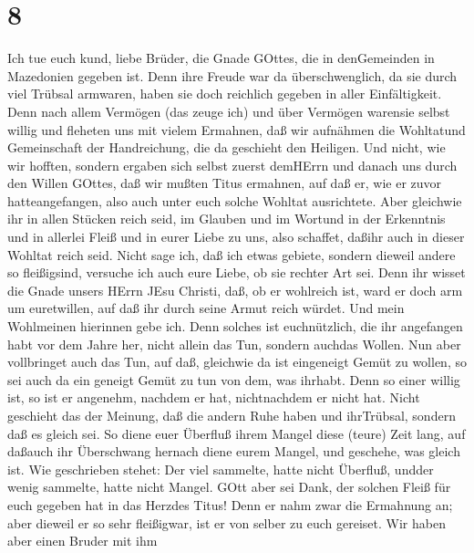 \hypertarget{section-7}{%
\section{8}\label{section-7}}

 Ich tue euch kund, liebe Brüder, die Gnade GOttes, die in
denGemeinden in Mazedonien gegeben ist.  Denn ihre Freude
war da überschwenglich, da sie durch viel Trübsal armwaren, haben sie
doch reichlich gegeben in aller Einfältigkeit.  Denn nach
allem Vermögen (das zeuge ich) und über Vermögen warensie selbst willig
 und fleheten uns mit vielem Ermahnen, daß wir aufnähmen die
Wohltatund Gemeinschaft der Handreichung, die da geschieht den Heiligen.
 Und nicht, wie wir hofften, sondern ergaben sich selbst
zuerst demHErrn und danach uns durch den Willen GOttes,  daß
wir mußten Titus ermahnen, auf daß er, wie er zuvor hatteangefangen,
also auch unter euch solche Wohltat ausrichtete.  Aber
gleichwie ihr in allen Stücken reich seid, im Glauben und im Wortund in
der Erkenntnis und in allerlei Fleiß und in eurer Liebe zu uns, also
schaffet, daßihr auch in dieser Wohltat reich seid.  Nicht
sage ich, daß ich etwas gebiete, sondern dieweil andere so fleißigsind,
versuche ich auch eure Liebe, ob sie rechter Art sei.  Denn
ihr wisset die Gnade unsers HErrn JEsu Christi, daß, ob er wohlreich
ist, ward er doch arm um euretwillen, auf daß ihr durch seine Armut
reich würdet.  Und mein Wohlmeinen hierinnen gebe ich. Denn
solches ist euchnützlich, die ihr angefangen habt vor dem Jahre her,
nicht allein das Tun, sondern auchdas Wollen.  Nun aber
vollbringet auch das Tun, auf daß, gleichwie da ist eingeneigt Gemüt zu
wollen, so sei auch da ein geneigt Gemüt zu tun von dem, was ihrhabt.
 Denn so einer willig ist, so ist er angenehm, nachdem er
hat, nichtnachdem er nicht hat.  Nicht geschieht das der
Meinung, daß die andern Ruhe haben und ihrTrübsal, sondern daß es gleich
sei.  So diene euer Überfluß ihrem Mangel diese (teure)
Zeit lang, auf daßauch ihr Überschwang hernach diene eurem Mangel, und
geschehe, was gleich ist.  Wie geschrieben stehet: Der viel
sammelte, hatte nicht Überfluß, undder wenig sammelte, hatte nicht
Mangel.  GOtt aber sei Dank, der solchen Fleiß für euch
gegeben hat in das Herzdes Titus!  Denn er nahm zwar die
Ermahnung an; aber dieweil er so sehr fleißigwar, ist er von selber zu
euch gereiset.  Wir haben aber einen Bruder mit ihm
